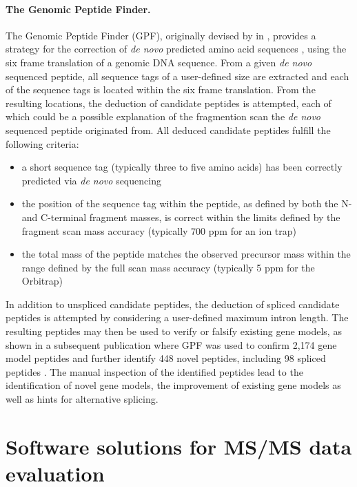 \paragraph{The Genomic Peptide Finder.}

\label{section:gpf}

The Genomic Peptide Finder (GPF), originally devised by \citeauthor{Allmer2004} 
in \citeyear{Allmer2004}, provides a strategy for the correction of 
{\em de novo} predicted amino acid sequences \citep{Allmer2004},
using the six frame translation of a genomic DNA sequence.
From a given {\em de novo} sequenced peptide, all sequence tags of a 
user-defined size are extracted and each of the sequence tags is located
within the six frame translation.
From the resulting locations, the deduction of candidate peptides is attempted,
each of which could be a possible explanation of the fragmention scan the
{\em de novo} sequenced peptide originated from.
All deduced candidate peptides fulfill the following criteria:

\begin{itemize}
\item a short sequence tag (typically three to five amino acids) has been 
correctly predicted via {\em de novo} sequencing 
\item the position of the sequence tag within the peptide, as defined by
both the N- and C-terminal fragment masses, is correct within the limits 
defined by the fragment scan mass accuracy (typically 700 ppm for an ion trap)
\item the total mass of the peptide matches the observed precursor mass
within the range defined by the full scan mass accuracy (typically 5 ppm for 
the Orbitrap)
\end{itemize}

In addition to unspliced candidate peptides, the deduction of spliced candidate
peptides is attempted by considering a user-defined maximum intron length.
The resulting peptides may then be used to verify or falsify existing gene 
models, as shown in a subsequent publication where GPF was used to confirm 
2,174 gene model peptides and further identify 448 novel peptides, including 98 
spliced peptides \citep{Allmer2006}.
The manual inspection of the identified peptides lead to the identification
of novel gene models, the improvement of existing gene models as well as 
hints for alternative splicing.

\section{Software solutions for MS/MS data evaluation}

